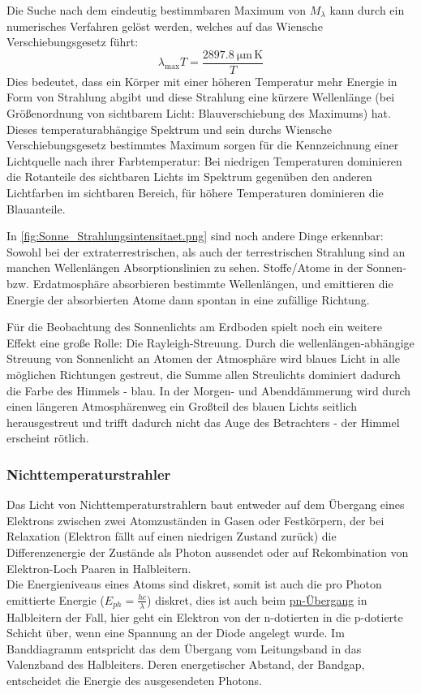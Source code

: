 Die Suche nach dem eindeutig bestimmbaren Maximum von \(M_\lambda\) kann durch ein numerisches Verfahren gelöst werden, welches auf das Wiensche Verschiebungsgesetz führt: 
\begin{equation}
    \lambda_{\text{max}} T = \frac{\qty{2897.8}{\micro\m\,\kelvin}}{T}
    \label{eq:WienschesGesetz}
\end{equation}
Dies bedeutet, dass ein Körper mit einer höheren Temperatur mehr Energie in Form von Strahlung abgibt und diese Strahlung eine kürzere Wellenlänge (bei Größenordnung von sichtbarem Licht: Blauverschiebung des Maximums) hat. Dieses temperaturabhängige Spektrum und sein durchs Wiensche Verschiebungsgesetz bestimmtes Maximum sorgen für die Kennzeichnung einer Lichtquelle nach ihrer Farbtemperatur: Bei niedrigen Temperaturen dominieren die Rotanteile des sichtbaren Lichts im Spektrum gegenüben den anderen Lichtfarben im sichtbaren Bereich, für höhere Temperaturen dominieren die Blauanteile. \par
In \cref{fig:Sonne_Strahlungsintensitaet.png} sind noch andere Dinge erkennbar: Sowohl bei der extraterrestrischen, als auch der terrestrischen Strahlung sind an manchen Wellenlängen Absorptionslinien zu sehen. Stoffe/Atome in der Sonnen- bzw. Erdatmosphäre absorbieren bestimmte Wellenlängen, und emittieren die Energie der absorbierten Atome dann spontan in eine zufällige Richtung. \par
Für die Beobachtung des Sonnenlichts am Erdboden spielt noch ein weitere Effekt eine große Rolle: Die Rayleigh-Streuung. Durch die wellenlängen-abhängige Streuung von Sonnenlicht an Atomen der Atmosphäre wird blaues Licht in alle möglichen Richtungen gestreut, die Summe allen Streulichts dominiert dadurch die Farbe des Himmels - blau. In der Morgen- und Abenddämmerung wird durch einen längeren Atmosphärenweg ein Großteil des blauen Lichts seitlich herausgestreut und trifft dadurch nicht das Auge des Betrachters - der Himmel erscheint rötlich. 


\subsubsection{Nichttemperaturstrahler}
Das Licht von Nichttemperaturstrahlern
baut entweder auf dem Übergang eines Elektrons zwischen zwei Atomzuständen in Gasen oder Festkörpern, der bei Relaxation (Elektron fällt auf einen niedrigen Zustand zurück) die Differenzenergie der Zustände als Photon aussendet oder auf Rekombination von Elektron-Loch Paaren in Halbleitern.\\
Die Energieniveaus eines Atoms sind diskret, somit ist auch die pro Photon emittierte Energie (\(E_{ph}=\frac{hc}{\lambda}\)) diskret, dies ist auch beim \href{https://de.wikipedia.org/wiki/Leuchtdiode#Funktionsprinzip}{pn-Übergang} in Halbleitern der Fall, hier geht ein Elektron von der n-dotierten in die p-dotierte Schicht über, wenn eine Spannung an der Diode angelegt wurde. Im Banddiagramm entspricht das dem Übergang vom Leitungsband in das Valenzband des Halbleiters. Deren energetischer Abstand, der Bandgap, entscheidet die Energie des ausgesendeten Photons. 

